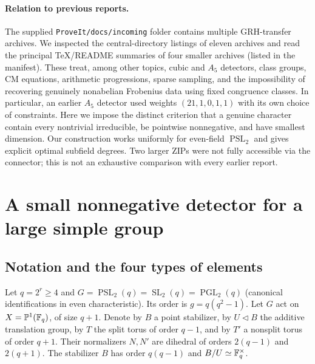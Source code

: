 \documentclass[11pt]{article}
\theoremstyle{remark}\newtheorem{remark}[theorem]{Remark}
\DeclareMathOperator{\PSL}{PSL}\DeclareMathOperator{\SL}{SL}\DeclareMathOperator{\PGL}{PGL}\DeclareMathOperator{\Ind}{Ind}\DeclareMathOperator{\ord}{ord}\DeclareMathOperator{\Gal}{Gal}\DeclareMathOperator{\Tr}{Tr}\DeclareMathOperator{\Rea}{Re}\DeclareMathOperator{\FP}{FP}
\begin{document}
\paragraph{Relation to previous reports.} The supplied \texttt{ProveIt/docs/incoming} folder \cite{incoming} contains multiple GRH-transfer archives. We inspected the central-directory listings of eleven archives and read the principal TeX/README summaries of four smaller archives (listed in the manifest). These treat, among other topics, cubic and $A_5$ detectors, class groups, CM equations, arithmetic progressions, sparse sampling, and the impossibility of recovering genuinely nonabelian Frobenius data using fixed congruence classes. In particular, an earlier $A_5$ detector used weights $(21,1,0,1,1)$ with its own choice of constraints. Here we impose the distinct criterion that a genuine character contain every nontrivial irreducible, be pointwise nonnegative, and have smallest dimension. Our construction works uniformly for even-field $\PSL_2$ and gives explicit optimal subfield degrees. Two larger ZIPs were not fully accessible via the connector; this is not an exhaustive comparison with every earlier report.

\section{A small nonnegative detector for a large simple group}
\subsection{Notation and the four types of elements}
Let $q=2^r\ge4$ and $G=\PSL_2(q)=\SL_2(q)=\PGL_2(q)$ (canonical identifications in even characteristic). Its order is $g=q(q^2-1)$. Let $G$ act on $X=\mathbb P^1(\mathbb F_q)$, of size $q+1$. Denote by $B$ a point stabilizer, by $U\lhd B$ the additive translation group, by $T$ the split torus of order $q-1$, and by $T'$ a nonsplit torus of order $q+1$. Their normalizers $N,N'$ are dihedral of orders $2(q-1)$ and $2(q+1)$. The stabilizer $B$ has order $q(q-1)$ and $B/U\simeq\mathbb F_q^\times$.
\end{document}
